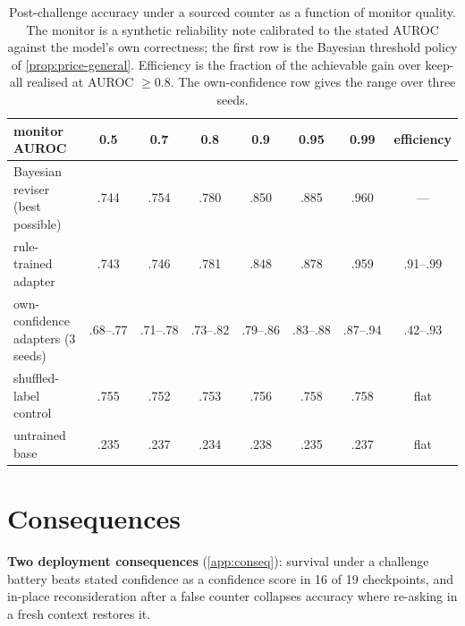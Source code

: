 \documentclass{article}
\begin{document}
\begin{table}[t]
\caption{Post-challenge accuracy under a sourced counter as a function of monitor quality. The monitor is a synthetic reliability note calibrated to the stated AUROC against the model's own correctness; the first row is the Bayesian threshold policy of \cref{prop:price-general}. Efficiency is the fraction of the achievable gain over keep-all realised at AUROC $\geq 0.8$. The own-confidence row gives the range over three seeds.}
\label{tab:synth}
\vskip 0.05in
\centering\small
\setlength{\tabcolsep}{4.5pt}
\begin{tabular}{lcccccc|c}
\toprule
monitor AUROC & 0.5 & 0.7 & 0.8 & 0.9 & 0.95 & 0.99 & efficiency \\
\midrule
Bayesian reviser (best possible) & .744 & .754 & .780 & .850 & .885 & .960 & --- \\
rule-trained adapter & .743 & .746 & .781 & .848 & .878 & .959 & .91--.99 \\
own-confidence adapters (3 seeds) & .68--.77 & .71--.78 & .73--.82 & .79--.86 & .83--.88 & .87--.94 & .42--.93 \\
shuffled-label control & .755 & .752 & .753 & .756 & .758 & .758 & flat \\
untrained base & .235 & .237 & .234 & .238 & .235 & .237 & flat \\
\bottomrule
\end{tabular}
\end{table}

\section{Consequences}
\label{sec:uses}

\textbf{Two deployment consequences} (\cref{app:conseq}): survival under a challenge battery beats stated confidence as a confidence score in 16 of 19 checkpoints, and in-place reconsideration after a false counter collapses accuracy where re-asking in a fresh context restores it.
\end{document}
